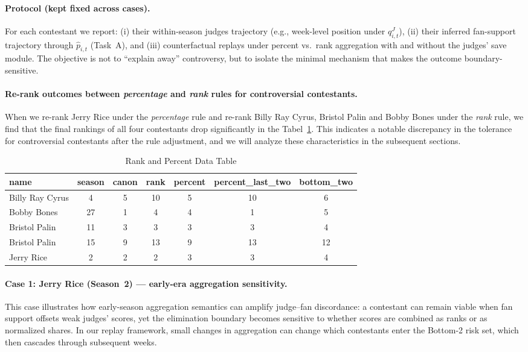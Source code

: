 \paragraph{Protocol (kept fixed across cases).}
For each contestant we report: (i) their within-season judges trajectory (e.g., week-level position under $q^J_{i,t}$), (ii) their inferred fan-support trajectory
through $\hat p_{i,t}$ (Task~A), and (iii) counterfactual replays under percent vs.\ rank aggregation with and without the judges' save module.
The objective is not to ``explain away'' controversy, but to isolate the minimal mechanism that makes the outcome boundary-sensitive.

\paragraph{Re-rank outcomes between \textit{percentage} and \textit{rank} rules for controversial contestants.} 
When we re-rank Jerry Rice under the \textit{percentage} rule and re-rank Billy Ray Cyrus, Bristol Palin and Bobby Bones under the \textit{rank} rule, 
we find that the final rankings of all four contestants drop significantly in the Tabel~\ref{tab:rank_percent}. This indicates a notable discrepancy in the tolerance for controversial 
contestants after the rule adjustment, and we will analyze these characteristics in the subsequent sections.

\begin{table}[htbp]
  \centering
  \caption{Rank and Percent Data Table} %
  \begin{tabular}{lcccccc} %
    \toprule
    name & season & canon & rank & percent & percent\_last\_two & bottom\_two \\
    \midrule
    Billy Ray Cyrus & 4 & 5 & 10 & 5 & 10 & 6 \\
    Bobby Bones    & 27 & 1 & 4 & 4 & 1 & 5 \\
    Bristol Palin  & 11 & 3 & 3 & 3 & 3 & 4 \\
    Bristol Palin  & 15 & 9 & 13 & 9 & 13 & 12 \\
    Jerry Rice     & 2 & 2 & 2 & 3 & 3 & 4 \\
    \bottomrule
  \end{tabular}
  \label{tab:rank_percent} %
\end{table}

\paragraph{Case 1: Jerry Rice (Season~2) --- early-era aggregation sensitivity.}
This case illustrates how early-season aggregation semantics can amplify judge--fan discordance: a contestant can remain viable when fan support offsets weak
judges' scores, yet the elimination boundary becomes sensitive to whether scores are combined as ranks or as normalized shares.
In our replay framework, small changes in aggregation can change which contestants enter the Bottom-2 risk set, which then cascades through subsequent weeks.


